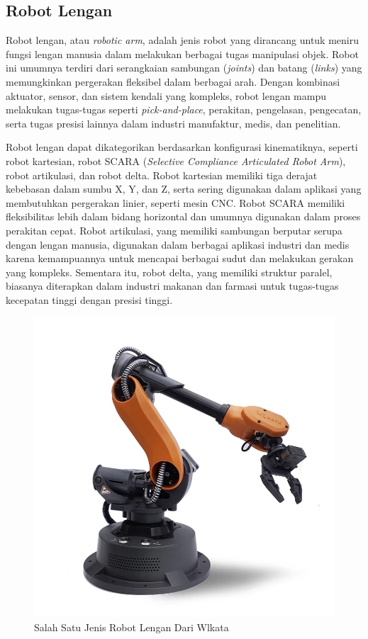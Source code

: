 \subsection{Robot Lengan}

Robot lengan, atau \emph{robotic arm}, adalah jenis robot yang dirancang untuk meniru fungsi lengan manusia
dalam melakukan berbagai tugas manipulasi objek. Robot ini umumnya terdiri dari serangkaian sambungan (\emph{joints})
dan batang (\emph{links}) yang memungkinkan pergerakan fleksibel dalam berbagai arah. Dengan kombinasi aktuator,
sensor, dan sistem kendali yang kompleks, robot lengan mampu melakukan tugas-tugas seperti \emph{pick-and-place},
perakitan, pengelasan, pengecatan, serta tugas presisi lainnya dalam industri manufaktur, medis, dan penelitian.

Robot lengan dapat dikategorikan berdasarkan konfigurasi kinematiknya, seperti robot kartesian,
robot SCARA (\emph{Selective Compliance Articulated Robot Arm}), robot artikulasi, dan robot delta.
Robot kartesian memiliki tiga derajat kebebasan dalam sumbu X, Y, dan Z, serta sering digunakan
dalam aplikasi yang membutuhkan pergerakan linier, seperti mesin CNC. Robot SCARA memiliki fleksibilitas
lebih dalam bidang horizontal dan umumnya digunakan dalam proses perakitan cepat. Robot artikulasi,
yang memiliki sambungan berputar serupa dengan lengan manusia, digunakan dalam berbagai aplikasi industri
dan medis karena kemampuannya untuk mencapai berbagai sudut dan melakukan gerakan yang kompleks.
Sementara itu, robot delta, yang memiliki struktur paralel, biasanya diterapkan dalam industri makanan
dan farmasi untuk tugas-tugas kecepatan tinggi dengan presisi tinggi.

\begin{figure} [H] \centering
  \includegraphics[scale=0.25]{gambar/arm_robot.png}
  \caption{Salah Satu Jenis Robot Lengan Dari Wlkata}
  \label{fig:arm_robot}
\end{figure}

